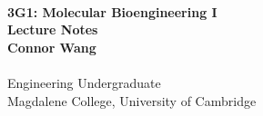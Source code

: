 \begin{titlepage}
\normalsize {}\\[2in]
\begin{center}

\LARGE \textbf {3G1: Molecular Bioengineering I \\[.1in] Lecture Notes}\\[3in]


       

\normalsize \textbf{Connor Wang}\\[.2in]
\\
Engineering Undergraduate\\
Magdalene College, University of Cambridge\\


\end{center}

\end{titlepage}
